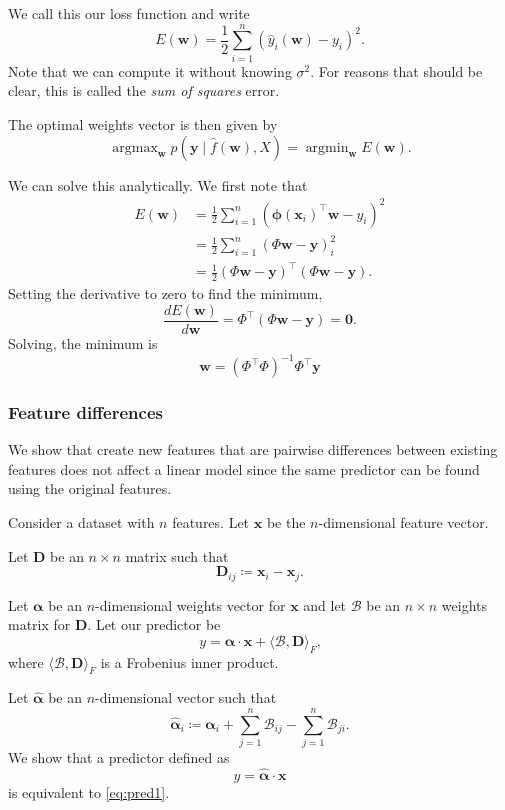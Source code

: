 \documentclass[11pt,twoside]{report}
\newcommand\bw{\mathbf{w}}
\newcommand\bx{\mathbf{x}}
\newcommand\by{\mathbf{y}}
\newcommand\bphi{\bm{\phi}}
\DeclareMathOperator*{\argmax}{argmax}
\DeclareMathOperator*{\argmin}{argmin}
\begin{document}
We call this our loss function and write\[
    E(\bw) = \frac12\sum_{i = 1}^{n}(\hat y_i(\bw) - y_i)^2 \text{.}
\] Note that we can compute it without knowing $\sigma^2$. For reasons that should be clear, this is called the \textit{sum of squares} error.

The optimal weights vector is then given by \[
    \argmax_{\bw} p(\by \mid \hat f(\bw), X) = \argmin_{\bw} E(\bw) \text{.}
\]

We can solve this analytically. We first note that \begin{align*}
    E(\bw) &= \frac12\sum_{i = 1}^{n}(\bphi(\bx_i)^\top \bw - y_i)^2 \\
    &= \frac12\sum_{i = 1}^{n}(\Phi \bw - \by)_i^2 \\
    &= \frac12(\Phi \bw - \by)^\top(\Phi \bw - \by) \text{.}
\end{align*} Setting the derivative to zero to find the minimum, \[
    \frac{dE(\bw)}{d\bw} = \Phi^\top (\Phi\bw - \by) = \mathbf{0} \text{.}
\] Solving, the minimum is \[
    \bw  = \left(\Phi^\top\Phi\right)^{-1}\Phi^\top\by
\]

\subsubsection{Feature differences}

We show that create new features that are pairwise differences between existing features does not affect a linear model since the same predictor can be found using the original features.

Consider a dataset with $n$ features. Let $\mathbf{x}$ be the $n$-dimensional feature vector.

Let $\mathbf{D}$ be an $n \times n$ matrix such that \[
    \mathbf{D}_{ij} \coloneqq \mathbf{x}_i - \mathbf{x}_j \text{.}
\]

Let $\bm{\alpha}$ be an $n$-dimensional weights vector for $\mathbf{x}$ and let $\mathcal{B}$ be an $n \times n$ weights matrix for $\mathbf{D}$. Let our predictor be\[
    y = \bm{\alpha} \cdot \mathbf{x} + \langle \mathcal{B}, \mathbf{D} \rangle_F \text{,}\label{eq:pred1}\tag{$*$}
\] where $\langle \mathcal{B}, \mathbf{D} \rangle_F$ is a Frobenius inner product.

Let $\hat{\bm{\alpha}}$ be an $n$-dimensional vector such that \[
    \hat{\bm{\alpha}}_i \coloneqq \bm{\alpha}_i + \sum_{j=1}^n \mathcal{B}_{ij} - \sum_{j=1}^n \mathcal{B}_{ji} \text{.}
\] We show that a predictor defined as \[
    y = \hat{\bm{\alpha}} \cdot \mathbf{x}
\] is equivalent to \eqref{eq:pred1}.
\end{document}
